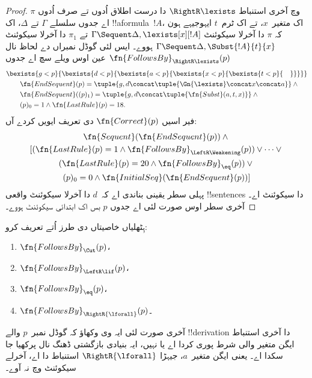 \documentclass[../../../include/open-logic-section]{subfiles}
\begin{document}
\begin{proof}
$\pi$ وچ آخری استنباط
$\RightR\lexists$
دا درست اطلاق اُدوں تے صرف اُدوں اے جدوں
سلسلے $\Gamma$
تے $\Delta$، اک
!!a{formula}~$!A$،
اک متغیر~$x$،
تے اک ٹرم~$t$
ایہوجیہے ہون کہ
$\pi$ دا آخرلا
سیکوئنٹ
$\Gamma \Sequent \Delta, \lexists[x][!A]$
تے $\pi_1$ دا
آخرلا سیکوئنٹ
$\Gamma \Sequent \Delta,
\Subst{!A}{t}{x}$
ہووے۔ ایس لئی گوڈل
نمبراں دے لحاظ نال
$\fn{FollowsBy}_{\RightR\lexists}(p)$
عین اوس ویلے سچ اے
جدوں
\begin{align*}
  & \bexists{g<p}{\bexists{d<p}{\bexists{a<p}{\bexists{x<p}{\bexists{t<p}{\quad}}}}}\\
  & \qquad \fn{EndSequent}(p) =
  \tuple{
    g,
    d \concat \tuple{\Gn{\lexists} \concat x \concat a}
  } \land {}\\
  & \qquad \fn{EndSequent}((p)_1) =
  \tuple{
    g,
    d \concat \tuple{\fn{Subst}(a, t, x)}
  } \land {}\\
  & \qquad (p)_0 = 1 \land \fn{LastRule}(p) = 18.
\end{align*}
فیر اسیں $\fn{Correct}(p)$ دی تعریف ایویں کردے آں:
\begin{multline*}
  \fn{Sequent}(\fn{EndSequent}(p)) \land {}\\
  [(\fn{LastRule}(p) = 1 \land
  \fn{FollowsBy}_{\LeftR\Weakening}(p)) \lor \dots \lor {}\\
  (\fn{LastRule}(p) = 20 \land \fn{FollowsBy}_{\eq}(p)) \lor {}\\
  (p)_0 = 0 \land \fn{InitialSeq}(\fn{EndSequent}(p))]
\end{multline*}
پہلی سطر یقینی بناندی
اے کہ~$d$ دا آخرلا
سیکوئنٹ واقعی
!!{sentence}s دا
سیکوئنٹ اے۔ آخری
سطر اوس صورت لئی اے
جدوں $p$ بس اک
ابتدائی سیکوئنٹ ہووے۔
\end{proof}

\begin{prob}
ہِٹھلیاں خاصیتاں
دی طرز اُتے تعریف کرو:
\begin{enumerate}
\item $\fn{FollowsBy}_{\Cut}(p)$،
\item $\fn{FollowsBy}_{\LeftR\lif}(p)$،
\item $\fn{FollowsBy}_{\eq}(p)$،
\item $\fn{FollowsBy}_{\RightR{\lforall}}(p)$۔
\end{enumerate}
آخری صورت لئی ایہ وی وکھاؤ کہ
گوڈل نمبر~$p$
والے !!{derivation}
دا آخری استنباط
ایگن متغیر والی
شرط پوری کردا
اے یا نہیں، ایہ
بنیادی بازگشتی
ڈھنگ نال پرکھیا
جا سکدا اے۔ یعنی
ایگن متغیر~$a$،
جیہڑا $\RightR{\lforall}$
استنباط دا اے،
آخرلے سیکوئنٹ
وچ نہ آوے۔
\end{prob}
\end{document}
